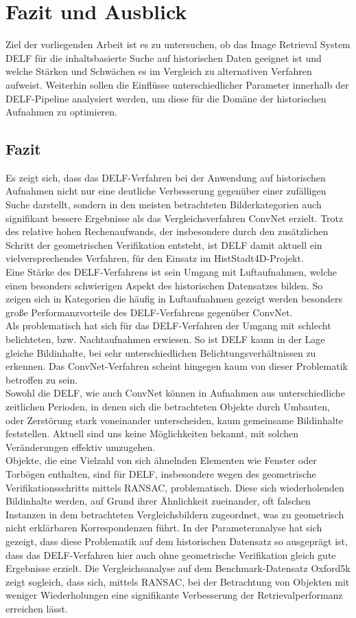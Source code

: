 \chapter{Fazit und Ausblick}

Ziel der vorliegenden Arbeit ist es zu untersuchen, ob das Image Retrieval System DELF für die inhaltsbasierte Suche auf historischen Daten geeignet ist und welche Stärken und Schwächen es im Vergleich zu alternativen Verfahren aufweist. Weiterhin sollen die Einflüsse unterschiedlicher Parameter innerhalb der DELF-Pipeline analysiert werden, um diese für die Domäne der historischen Aufnahmen zu optimieren.
\section{Fazit}
Es zeigt sich, dass das DELF-Verfahren bei der Anwendung auf historischen Aufnahmen nicht nur eine deutliche Verbesserung gegenüber einer zufälligen Suche darstellt, sondern in den meisten betrachteten Bilderkategorien auch signifikant bessere Ergebnisse als das Vergleichsverfahren ConvNet erzielt. Trotz des relative hohen Rechenaufwands, der insbesondere durch den zusätzlichen Schritt der geometrischen Verifikation entsteht, ist DELF damit aktuell ein vielversprechendes Verfahren, für den Einsatz im HistStadt4D-Projekt.
\\
Eine Stärke des DELF-Verfahrens ist sein Umgang mit Luftaufnahmen, welche einen besonders schwierigen Aspekt des historischen Datensatzes bilden. So zeigen sich in Kategorien die häufig in Luftaufnahmen gezeigt werden besonders große Performanzvorteile des DELF-Verfahrens gegenüber ConvNet.
\\
Als problematisch hat sich für das DELF-Verfahren der Umgang mit schlecht belichteten, bzw. Nachtaufnahmen erwiesen. So ist DELF kaum in der Lage gleiche Bildinhalte, bei sehr unterschiedlichen Belichtungsverhältnissen zu erkennen. Das ConvNet-Verfahren scheint hingegen kaum von dieser Problematik betroffen zu sein.
\\
Sowohl die DELF, wie auch ConvNet können in Aufnahmen aus unterschiedliche zeitlichen Perioden, in denen sich die betrachteten Objekte durch Umbauten, oder Zerstörung stark voneinander unterscheiden, kaum gemeinsame Bildinhalte feststellen. Aktuell sind uns keine Möglichkeiten bekannt, mit solchen Veränderungen effektiv umzugehen.
\\
Objekte, die eine Vielzahl von sich ähnelnden Elementen wie Fenster oder Torbögen enthalten, sind für DELF, insbesondere wegen des geometrische Verifikationsschritts mittels RANSAC, problematisch. Diese sich wiederholenden Bildinhalte werden, auf Grund ihrer Ähnlichkeit zueinander, oft falschen Instanzen in dem betrachteten Vergleichsbildern zugeordnet, was zu geometrisch nicht erklärbaren Korrespondenzen führt. In der Parameteranalyse hat sich gezeigt, dass diese Problematik auf dem historischen Datensatz so ausgeprägt ist, dass das DELF-Verfahren hier auch ohne geometrische Verifikation gleich gute Ergebnisse erzielt. Die Vergleichsanalyse auf dem Benchmark-Datensatz Oxford5k zeigt sogleich, dass sich, mittels RANSAC, bei der Betrachtung von Objekten mit weniger Wiederholungen eine signifikante Verbesserung der Retrievalperformanz erreichen lässt. 
